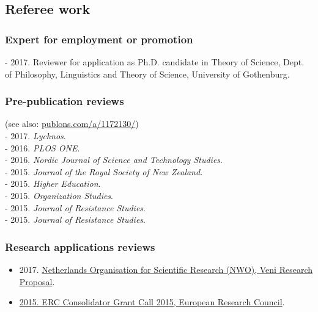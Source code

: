 \documentclass[a4paper,11pt,oneside]{article}
\begin{document}


\subsection{Referee work}

    \subsubsection{Expert for employment or promotion}
    - 2017. Reviewer for application as Ph.D. candidate in Theory of Science, Dept. of Philosophy, Linguistics and Theory of Science, University of Gothenburg.

    \subsubsection{Pre-publication reviews}
    (see also: \href{publons.com/a/1172130/}{publons.com/a/1172130/})\\
    - 2017. \emph{Lychnos}.\\
    - 2016. \emph{PLOS ONE}. \\
    - 2016. \emph{Nordic Journal of Science and Technology Studies}.\\
    - 2015. \emph{Journal of the Royal Society of New Zealand}. \\
    - 2015. \emph{Higher Education}.\\
    - 2015. \emph{Organization Studies}.\\
    - 2015. \emph{Journal of Resistance Studies}.\\
    - 2015. \emph{Journal of Resistance Studies}.

    \subsubsection{Research applications reviews}
    \begin{itemize}
      \item 2017. \href{http://files.christopherkullenberg.se/NWOreview.pdf}{Netherlands Organisation for Scientific Research (NWO), Veni Research Proposal}.
      \item \href{http://files.christopherkullenberg.se/erc.pdf}{2015. ERC Consolidator Grant Call 2015, European Research Council}.
    \end{itemize}
\end{document}
